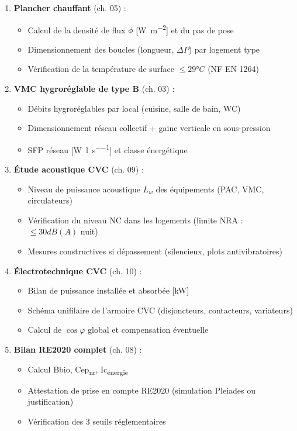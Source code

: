 \begin{methode}
\begin{enumerate}
  \item \textbf{Plancher chauffant} (ch. 05) :
    \begin{itemize}
      \item Calcul de la densité de flux $\phi$ [\si{\watt\per\metre\squared}] et du pas de pose
      \item Dimensionnement des boucles (longueur, $\Delta P$) par logement type
      \item Vérification de la température de surface $\leq 29°C$ (NF EN 1264)
    \end{itemize}

  \item \textbf{VMC hygroréglable de type B} (ch. 03) :
    \begin{itemize}
      \item Débits hygroréglables par local (cuisine, salle de bain, WC)
      \item Dimensionnement réseau collectif + gaine verticale en sous-pression
      \item SFP réseau [\si{\watt\per\litre\per\second}] et classe énergétique
    \end{itemize}

  \item \textbf{Étude acoustique CVC} (ch. 09) :
    \begin{itemize}
      \item Niveau de puissance acoustique $L_w$ des équipements (PAC, VMC, circulateurs)
      \item Vérification du niveau NC dans les logements (limite NRA : $\leq 30 dB(A)$ nuit)
      \item Mesures constructives si dépassement (silencieux, plots antivibratoires)
    \end{itemize}

  \item \textbf{Électrotechnique CVC} (ch. 10) :
    \begin{itemize}
      \item Bilan de puissance installée et absorbée [\si{\kilo\watt}]
      \item Schéma unifilaire de l'armoire CVC (disjoncteurs, contacteurs, variateurs)
      \item Calcul de $\cos\varphi$ global et compensation éventuelle
    \end{itemize}

  \item \textbf{Bilan RE2020 complet} (ch. 08) :
    \begin{itemize}
      \item Calcul Bbio, Cep\textsubscript{nr}, Ic\textsubscript{énergie}
      \item Attestation de prise en compte RE2020 (simulation Pleiades ou justification)
      \item Vérification des 3 seuils réglementaires
    \end{itemize}


\end{enumerate}
\end{methode}
